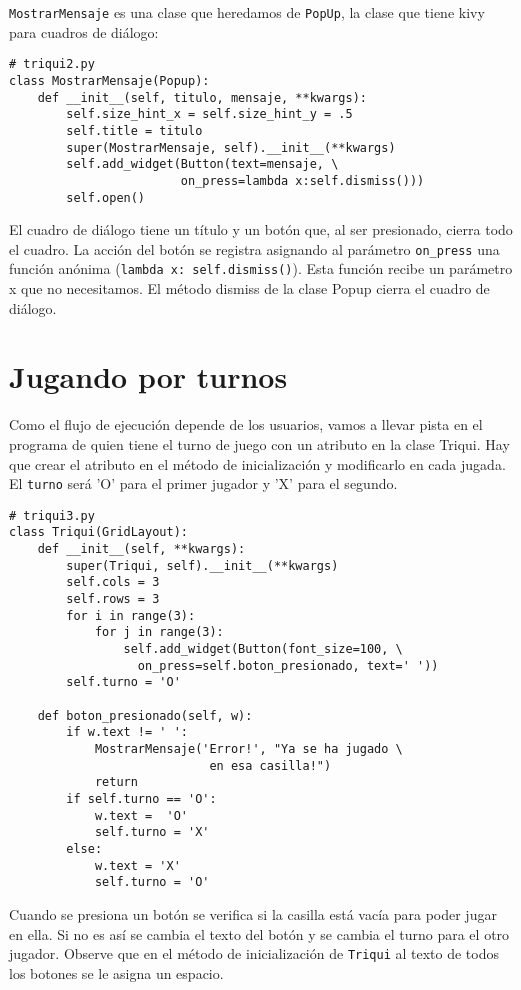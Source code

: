 \texttt{MostrarMensaje} es una clase que heredamos de \texttt{PopUp},
la clase que tiene kivy para cuadros de diálogo:

\begin{verbatim}
# triqui2.py
class MostrarMensaje(Popup): 
    def __init__(self, titulo, mensaje, **kwargs):
        self.size_hint_x = self.size_hint_y = .5
        self.title = titulo
        super(MostrarMensaje, self).__init__(**kwargs)
        self.add_widget(Button(text=mensaje, \
                        on_press=lambda x:self.dismiss()))
        self.open()
\end{verbatim}

El cuadro de diálogo tiene un título y un botón que, al ser presionado,
cierra todo el cuadro. La acción del botón se registra asignando al
parámetro \lstinline!on_press!
una función anónima (\lstinline!lambda x: self.dismiss()!).
Esta función recibe un parámetro x que no necesitamos. El método dismiss
de la clase Popup cierra el cuadro de diálogo.

\section{Jugando por turnos}

Como el flujo de ejecución depende de los usuarios, vamos a llevar
pista en el programa de quien tiene el turno de juego con un atributo
en la clase Triqui. Hay que crear el atributo en el método de inicialización
y modificarlo en cada jugada. El \texttt{turno} será 'O' para el primer
jugador y 'X' para el segundo.

\begin{verbatim}
# triqui3.py
class Triqui(GridLayout):
    def __init__(self, **kwargs):
        super(Triqui, self).__init__(**kwargs)
        self.cols = 3
        self.rows = 3
        for i in range(3):
            for j in range(3):
                self.add_widget(Button(font_size=100, \
                  on_press=self.boton_presionado, text=' '))
        self.turno = 'O'

    def boton_presionado(self, w):
        if w.text != ' ':
            MostrarMensaje('Error!', "Ya se ha jugado \
                            en esa casilla!")
            return
        if self.turno == 'O':
            w.text =  'O'
            self.turno = 'X'
        else:
            w.text = 'X'
            self.turno = 'O'
\end{verbatim}

Cuando se presiona un botón se verifica si la casilla está vacía para
poder jugar en ella. Si no es así se cambia el texto del botón y se
cambia el turno para el otro jugador. Observe que en el método de
inicialización de \texttt{Triqui} al texto de todos los botones se
le asigna un espacio.

